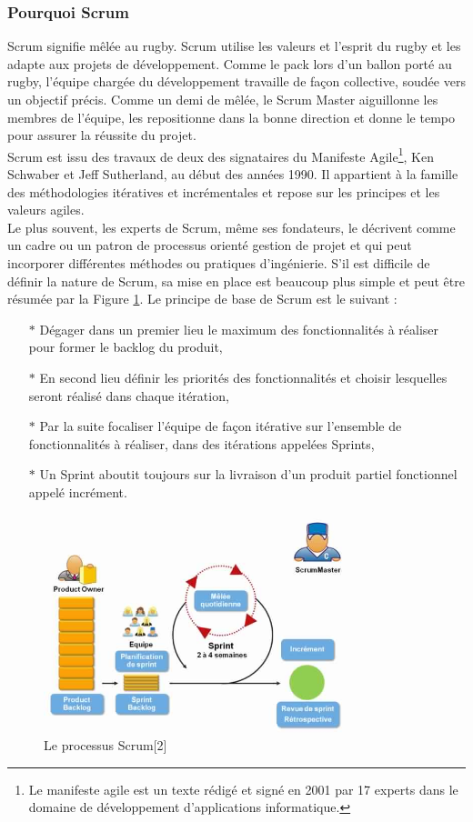 \documentclass{article}
\begin{document}
\subsubsection{Pourquoi Scrum}
\guillemotleft Scrum signifie mêlée au rugby. Scrum utilise les valeurs et l’esprit du rugby et les adapte aux projets de développement. Comme le pack lors d’un ballon porté au rugby, l’équipe chargée du développement travaille de façon collective, soudée vers un objectif précis. Comme un demi de mêlée, le Scrum Master aiguillonne les membres de l’équipe, les repositionne dans la bonne direction et donne le tempo pour assurer la réussite du projet. \guillemotright [1]\\
Scrum est issu des travaux de deux des signataires du Manifeste Agile\footnote{Le manifeste agile est un texte rédigé et signé en 2001 par 17 experts dans le domaine de développement d’applications informatique.}, Ken Schwaber et Jeff Sutherland, au début des années 1990. Il appartient à la famille des méthodologies itératives et incrémentales et repose sur les principes et les valeurs agiles.\\
Le plus souvent, les experts de Scrum, même ses fondateurs, le décrivent comme un cadre ou un patron de processus orienté gestion de projet et qui peut incorporer différentes méthodes ou pratiques d’ingénierie.
\cleardoublepage
S’il est difficile de définir la nature de Scrum, sa mise en place est beaucoup plus simple et peut être résumée par la Figure \ref{fig:pic2}. Le principe de base de Scrum est le suivant :
\begin{itemize}
\item[$\ast$] Dégager dans un premier lieu le maximum des fonctionnalités à réaliser pour former le backlog du produit,
\item[$\ast$] En second lieu définir les priorités des fonctionnalités et choisir lesquelles seront réalisé dans chaque itération,
\item[$\ast$]Par la suite focaliser l'équipe de façon itérative sur l’ensemble de fonctionnalités à réaliser, dans des itérations appelées Sprints,
\item[$\ast$]Un Sprint aboutit toujours sur la livraison d’un produit partiel fonctionnel appelé incrément.
\end{itemize}
\begin{figure}[H]
\centering
\includegraphics[height=2.5in]{methode-scrum.jpg}
\caption[Figure2 : Le processus Scrum]{Le processus Scrum[2]}
\label{fig:pic2}
\end{figure}
\end{document}
